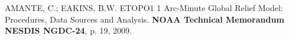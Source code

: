 
\begin{thebibliography}{20}
\begin{small}

   AMANTE, C.; EAKINS, B.W. ETOPO1 1 Arc-Minute Global Relief Model: Procedures, Data Sources and Analysis. \textbf{NOAA Technical Memorandum NESDIS NGDC-24}, p. 19, 2009.

\end{small}
\end{thebibliography}


